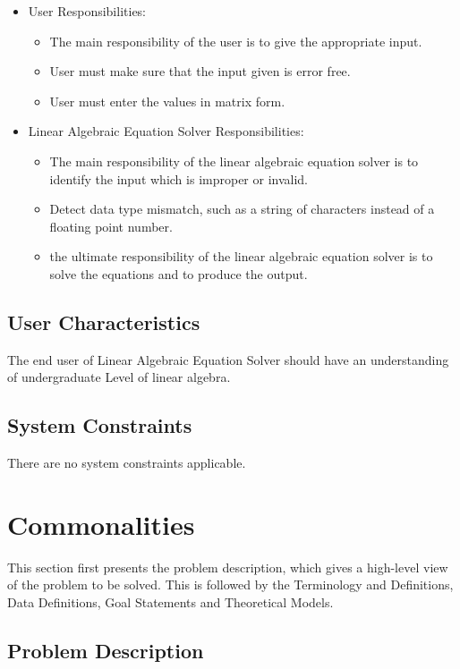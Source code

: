 \documentclass[12pt]{article}
\newcommand{\progname}{Linear Algebraic Equation Solver} %
\begin{document}
\begin{itemize}
\item User Responsibilities:
\begin{itemize}
\item The main responsibility of the user is to give the appropriate input.
\item User must make sure that the input given is error free.
\item User must enter the values in matrix form.
\end{itemize}
\item \progname{} Responsibilities:
\begin{itemize}
\item The main responsibility of the linear algebraic equation solver is to
identify the input which is improper or invalid.
\item Detect data type mismatch, such as a string of characters instead of a
  floating point number.
\item the ultimate responsibility of the linear algebraic equation solver is to
solve the equations and to produce the output.
\end{itemize}
\end{itemize}

\subsection{User Characteristics} \label{SecUserCharacteristics}

The end user of \progname{} should have an understanding of undergraduate Level
of linear algebra.

\subsection{System Constraints}

There are no system constraints applicable.

\section{Commonalities}

This section first presents the problem description, which gives a high-level
view of the problem to be solved. This is followed by the Terminology and
Definitions, Data Definitions, Goal Statements and Theoretical Models.

\subsection{Problem Description} \label{Sec_pd}
\end{document}
